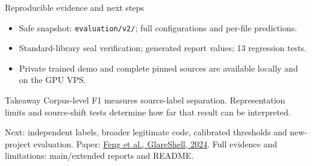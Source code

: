 \documentclass[aspectratio=169,11pt]{beamer}
\begin{document}
\begin{frame}{Reproducible evidence and next steps}
\begin{itemize}
\item Safe snapshot: \texttt{evaluation/v2/}; full configurations and per-file predictions.
\item Standard-library seal verification; generated report values; 13 regression tests.
\item Private trained demo and complete pinned sources are available locally and on the GPU VPS.
\end{itemize}
\begin{block}{Takeaway}
Corpus-level F1 measures source-label separation. Representation limits and source-shift tests determine how
far that result can be interpreted.
\end{block}
Next: independent labels, broader legitimate code, calibrated thresholds and new-project evaluation.
\vfill
\footnotesize Paper: \href{https://doi.org/10.1016/j.comnet.2024.110406}{Feng et al., GlareShell, 2024}.
Full evidence and limitations: main/extended reports and README.
\end{frame}
\end{document}
